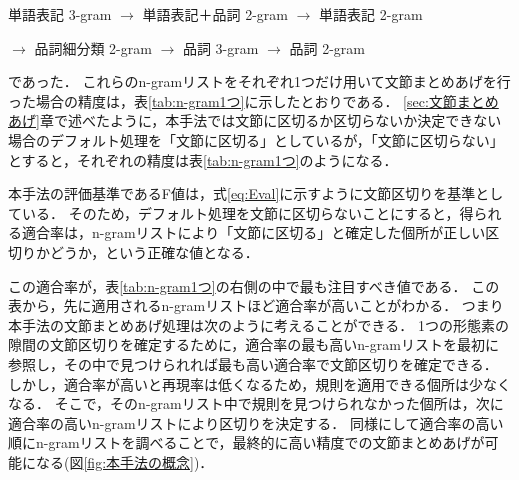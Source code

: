 \begin{center}
  単語表記 3-gram $\rightarrow$ 単語表記＋品詞 2-gram $\rightarrow$ 単語表記 2-gram

  $\rightarrow$ 品詞細分類 2-gram $\rightarrow$ 品詞 3-gram $\rightarrow$ 品詞 2-gram
\end{center}
であった．
これらのn-gramリストをそれぞれ1つだけ用いて文節まとめあげを行った場合の精度は，表\ref{tab:n-gram1つ}に示したとおりである．
\ref{sec:文節まとめあげ}章で述べたように，本手法では文節に区切るか区切らないか決定できない場合のデフォルト処理を「文節に区切る」としているが，「文節に区切らない」とすると，それぞれの精度は表\ref{tab:n-gram1つ}のようになる．

本手法の評価基準であるF値は，式\ref{eq:Eval}に示すように文節区切りを基準としている．
そのため，デフォルト処理を文節に区切らないことにすると，得られる適合率は，n-gramリストにより「文節に区切る」と確定した個所が正しい区切りかどうか，という正確な値となる．

この適合率が，表\ref{tab:n-gram1つ}の右側の中で最も注目すべき値である．
この表から，先に適用されるn-gramリストほど適合率が高いことがわかる．
つまり本手法の文節まとめあげ処理は次のように考えることができる．
1つの形態素の隙間の文節区切りを確定するために，適合率の最も高いn-gramリストを最初に参照し，その中で見つけられれば最も高い適合率で文節区切りを確定できる．
しかし，適合率が高いと再現率は低くなるため，規則を適用できる個所は少なくなる．
そこで，そのn-gramリスト中で規則を見つけられなかった個所は，次に適合率の高いn-gramリストにより区切りを決定する．
同様にして適合率の高い順にn-gramリストを調べることで，最終的に高い精度での文節まとめあげが可能になる(図\ref{fig:本手法の概念})．

